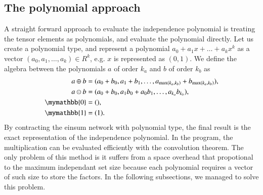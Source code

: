 \documentclass{article}
\newcommand{\<}{\langle}
\renewcommand{\>}{\rangle}
\theoremstyle{definition}\newtheorem{definition}{\textit{Definition}}
\begin{document}
\subsection{The polynomial approach}
A straight forward approach to evaluate the independence polynomial is treating the tensor elements as polynomials, and evaluate the polynomial directly.
Let us create a polynomial type, and represent a polynomial $a_0 + a_1 x + \ldots + a_k x^k$ as a vector $(a_0, a_1, \ldots, a_k) \in R^k$, e.g. $x$ is represented as $(0, 1)$.
We define the algebra between the polynomials $a$ of order $k_a$ and $b$ of order $k_b$ as
\begin{align}
    \begin{split}
    a \oplus b &= (a_0 + b_0, a_1 + b_1, \ldots, a_{\max(k_a, k_b)} + b_{\max(k_a, k_b)}),\\
    a \odot b &= (a_0 + b_0, a_1b_0 + a_0b_1, \ldots, a_{k_a} b_{k_b}),\\
    \mymathbb{0} &= (),\\
    \mymathbb{1} &= (1).
    \end{split}
\end{align}
By contracting the einsum network with polynomial type, the final result is the exact representation of the independence polynomial.
In the program, the multiplication can be evaluated efficiently with the convolution theorem.
The only problem of this method is it suffers from a space overhead that propotional to the maximum independant set size because each polynomial requires a vector of such size to store the factors.
In the following subsections, we managed to solve this problem.
\end{document}
